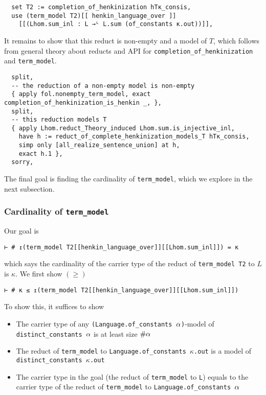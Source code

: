 \begin{lstlisting}
  set T2 := completion_of_henkinization hTκ_consis,
  use (term_model T2)[[ henkin_language_over ]]
    [[(Lhom.sum_inl : L →ᴸ L.sum (of_constants κ.out))]], \end{lstlisting}

It remains to show that this reduct is non-empty and a model of $T$,
which follows from general theory about reducts and API for
\texttt{completion\_of\_henkinization} and \texttt{term\_model}.

\begin{lstlisting}
  split,
  -- the reduction of a non-empty model is non-empty
  { apply fol.nonempty_term_model, exact completion_of_henkinization_is_henkin _, },
  split,
  -- this reduction models T
  { apply Lhom.reduct_Theory_induced Lhom.sum.is_injective_inl,
    have h := reduct_of_complete_henkinization_models_T hTκ_consis,
    simp only [all_realize_sentence_union] at h,
    exact h.1 },
  sorry, \end{lstlisting}

The final goal is finding the cardinality of \texttt{term\_model},
which we explore in the next subsection.

\subsubsection{Cardinality of \texttt{term\_model}}

Our goal is
\begin{lstlisting}
⊢ # ↥(term_model T2[[henkin_language_over]][[Lhom.sum_inl]]) = κ \end{lstlisting}
which says the cardinality of the carrier type of the
reduct of \texttt{term\_model T2} to $L$ is $\kappa$.
We first show $(\ge)$
\begin{lstlisting}
⊢ # κ ≤ ↥(term_model T2[[henkin_language_over]][[Lhom.sum_inl]]) \end{lstlisting}
To show this, it suffices to show
\begin{itemize}
  \item The carrier type of any \texttt{(Language.of\_constants $\alpha$)}-model of
        \texttt{distinct\_constants $\alpha$} is at least size $\# \alpha$
  \item The reduct of \texttt{term\_model} to
        \texttt{Language.of\_constants $\kappa$.out} is a model of
        \texttt{distinct\_constants $\kappa$.out}
  \item The carrier type in the goal (the reduct of \texttt{term\_model} to \texttt{L})
        equals to the carrier type of the reduct of \texttt{term\_model} to
        \texttt{Language.of\_constants $\alpha$}
\end{itemize}


